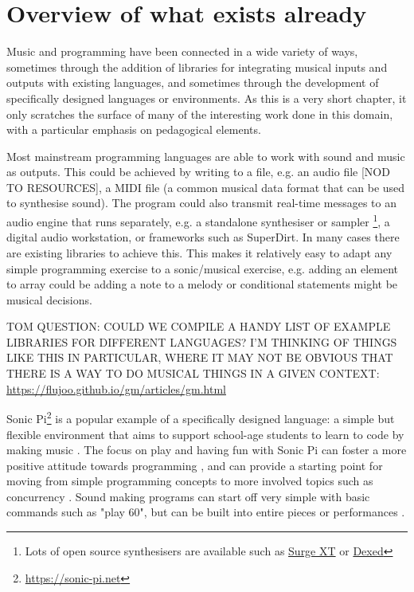 \section{Overview of what exists already} \label{sec:literature}

Music and programming have been connected in a wide variety of ways, sometimes through the addition of libraries for integrating musical inputs and outputs with existing languages, and sometimes through the development of specifically designed languages or environments. As this is a very short chapter, it only scratches the surface of many of the interesting work done in this domain, with a particular emphasis on pedagogical elements.

Most mainstream programming languages are able to work with sound and music as outputs. This could be achieved by writing to a file, e.g. an audio file [NOD TO RESOURCES], a MIDI file (a common musical data format that can be used to synthesise sound). The program could also transmit real-time messages to an audio engine that runs separately, e.g. a standalone synthesiser or sampler \footnote{Lots of open source synthesisers are available such as \href{https://surge-synthesizer.github.io/}{Surge XT} or \href{https://asb2m10.github.io/dexed/}{Dexed}}, a digital audio workstation, or frameworks such as SuperDirt. In many cases there are existing libraries to achieve this. This makes it relatively easy to adapt any simple programming exercise to a sonic/musical exercise, e.g. adding an element to array could be adding a note to a melody or conditional statements might be musical decisions.

TOM QUESTION: COULD WE COMPILE A HANDY LIST OF EXAMPLE LIBRARIES FOR DIFFERENT LANGUAGES? I'M THINKING OF THINGS LIKE THIS IN PARTICULAR, WHERE IT MAY NOT BE OBVIOUS THAT THERE IS A WAY TO DO MUSICAL THINGS IN A GIVEN CONTEXT:
\href{https://flujoo.github.io/gm/articles/gm.html}{https://flujoo.github.io/gm/articles/gm.html}


Sonic Pi\footnote{\url{https://sonic-pi.net}} is a popular example of a specifically designed language: a simple but flexible environment that aims to support school-age students to learn to code by making music \cite{aaron_sonic_2016}. The focus on play and having fun with Sonic Pi can foster a more positive attitude towards programming \cite{petri_sonicpi_2022}, and can provide a starting point for moving from simple programming concepts to more involved topics such as concurrency \cite{traversaro_hearplay_2024}. Sound making programs can start off very simple with basic commands such as "play 60", but can be built into entire pieces or performances \cite{}. 

